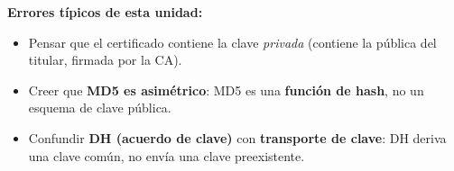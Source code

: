 \documentclass[../main.tex]{subfiles}
\begin{document}
\begin{ojo}
\textbf{Errores típicos de esta unidad:}
\begin{itemize}[leftmargin=1.4em,nosep]
  \item Pensar que el certificado contiene la clave \emph{privada} (contiene la
  pública del titular, firmada por la CA).
  \item Creer que \textbf{MD5 es asimétrico}: MD5 es una \textbf{función de hash},
  no un esquema de clave pública.
  \item Confundir \textbf{DH (acuerdo de clave)} con \textbf{transporte de clave}:
  DH deriva una clave común, no envía una clave preexistente.
\end{itemize}
\end{ojo}
\end{document}
